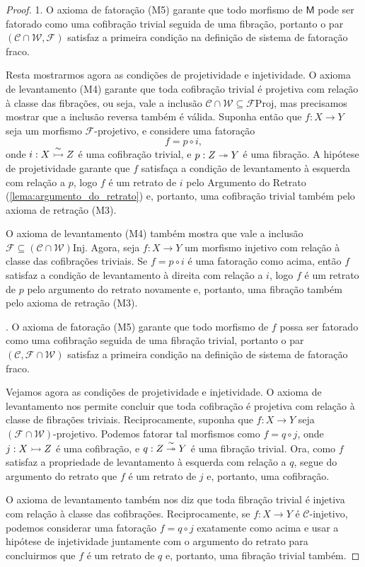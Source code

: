 \begin{proof}
  1. O axioma de fatoração (M5) garante que todo morfismo de $\mathsf{M}$ pode ser fatorado como uma cofibração trivial seguida de uma fibração, portanto o par $(\mathcal{C} \cap \mathcal{W}, \mathcal{F})$ satisfaz a primeira condição na definição de sistema de fatoração fraco.

  Resta mostrarmos agora as condições de projetividade e injetividade.
  O axioma de levantamento (M4) garante que toda cofibração trivial é projetiva com relação à classe das fibrações, ou seja, vale a inclusão $\mathcal{C} \cap \mathcal{W} \subseteq \mathcal{F}\mathrm{Proj}$, mas precisamos mostrar que a inclusão reversa também é válida.
  Suponha então que $f: X \to Y$ seja um morfismo $\mathcal{F}$-projetivo, e considere uma fatoração
  \begin{displaymath}
    f = p \circ i,
  \end{displaymath}
  onde $i: X \overset{\sim}{\rightarrowtail} Z$ é uma cofibração trivial, e $p: Z \twoheadrightarrow Y$ é uma fibração.
  A hipótese de projetividade garante que $f$ satisfaça a condição de levantamento à esquerda com relação a $p$, logo $f$ é um retrato de $i$ pelo Argumento do Retrato (\cref{lema:argumento_do_retrato}) e, portanto, uma cofibração trivial também pelo axioma de retração (M3).

  O axioma de levantamento (M4) também mostra que vale a inclusão $\mathcal{F} \subseteq (\mathcal{C} \cap \mathcal{W})\mathrm{Inj}$.
  Agora, seja $f: X \to Y$ um morfismo injetivo com relação à classe das cofibrações triviais.
  Se $f = p \circ i$ é uma fatoração como acima, então $f$ satisfaz a condição de levantamento à direita com relação a $i$, logo $f$ é um retrato de $p$ pelo argumento do retrato novamente e, portanto, uma fibração também pelo axioma de retração (M3).

  . O axioma de fatoração (M5) garante que todo morfismo de $f$ possa ser fatorado como uma cofibração seguida de uma fibração trivial, portanto o par $(\mathcal{C},\mathcal{F} \cap \mathcal{W})$ satisfaz a primeira condição na definição de sistema de fatoração fraco.

  Vejamos agora as condições de projetividade e injetividade.
  O axioma de levantamento nos permite concluir que toda cofibração é projetiva com relação à classe de fibrações triviais.
  Reciprocamente, suponha que $f: X \to Y$ seja $(\mathcal{F} \cap \mathcal{W})$-projetivo.
  Podemos fatorar tal morfismos como $f = q \circ j$, onde $j: X \rightarrowtail Z$ é uma cofibração, e $q: Z \overset{\sim}{\twoheadrightarrow} Y$ é uma fibração trivial.
  Ora, como $f$ satisfaz a propriedade de levantamento à esquerda com relação a $q$, segue do argumento do retrato que $f$ é um retrato de $j$ e, portanto, uma cofibração.

  O axioma de levantamento também nos diz que toda fibração trivial é injetiva com relação à classe das cofibrações.
  Reciprocamente, se $f: X \to Y$ é $\mathcal{C}$-injetivo, podemos considerar uma fatoração $f = q \circ j$ exatamente como acima e usar a hipótese de injetividade juntamente com o argumento do retrato para concluirmos que $f$ é um retrato de $q$ e, portanto, uma fibração trivial também.
\end{proof}

